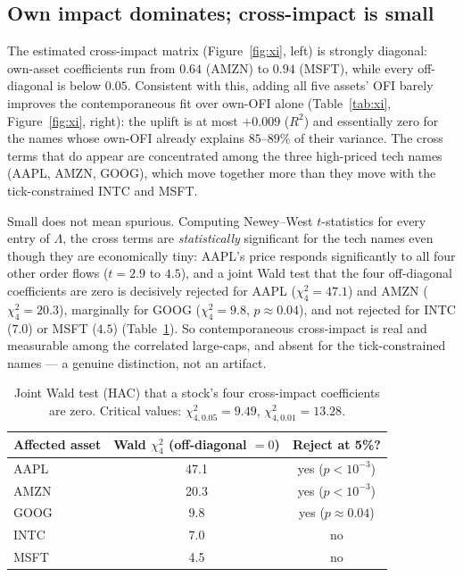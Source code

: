 \documentclass[11pt]{article}
\begin{document}
\subsection{Own impact dominates; cross-impact is small}
The estimated cross-impact matrix (Figure~\ref{fig:xi}, left) is strongly diagonal:
own-asset coefficients run from $0.64$ (AMZN) to $0.94$ (MSFT), while every
off-diagonal is below $0.05$. Consistent with this, adding all five assets' OFI
barely improves the contemporaneous fit over own-OFI alone (Table~\ref{tab:xi},
Figure~\ref{fig:xi}, right): the uplift is at most $+0.009$ ($R^2$) and essentially
zero for the names whose own-OFI already explains $85$--$89\%$ of their variance.
The cross terms that do appear are concentrated among the three high-priced tech
names (AAPL, AMZN, GOOG), which move together more than they move with the
tick-constrained INTC and MSFT.

Small does not mean spurious. Computing Newey--West $t$-statistics for every entry
of $\Lambda$, the cross terms are \emph{statistically} significant for the tech
names even though they are economically tiny: AAPL's price responds significantly to
all four other order flows ($t = 2.9$ to $4.5$), and a joint Wald test that the four
off-diagonal coefficients are zero is decisively rejected for AAPL
($\chi^2_4 = 47.1$) and AMZN ($\chi^2_4 = 20.3$), marginally for GOOG
($\chi^2_4 = 9.8$, $p\approx0.04$), and not rejected for INTC ($7.0$) or MSFT
($4.5$) (Table~\ref{tab:wald}). So contemporaneous cross-impact is real and
measurable among the correlated large-caps, and absent for the tick-constrained
names --- a genuine distinction, not an artifact.

\begin{table}[h]
\centering
\begin{tabular}{lcc}
\toprule
Affected asset & Wald $\chi^2_4$ (off-diagonal $=0$) & Reject at 5\%? \\
\midrule
AAPL & 47.1 & yes ($p<10^{-3}$) \\
AMZN & 20.3 & yes ($p<10^{-3}$) \\
GOOG & 9.8 & yes ($p\approx0.04$) \\
INTC & 7.0 & no \\
MSFT & 4.5 & no \\
\bottomrule
\end{tabular}
\caption{Joint Wald test (HAC) that a stock's four cross-impact coefficients are
zero. Critical values: $\chi^2_{4,0.05}=9.49$, $\chi^2_{4,0.01}=13.28$.}
\label{tab:wald}
\end{table}
\end{document}
